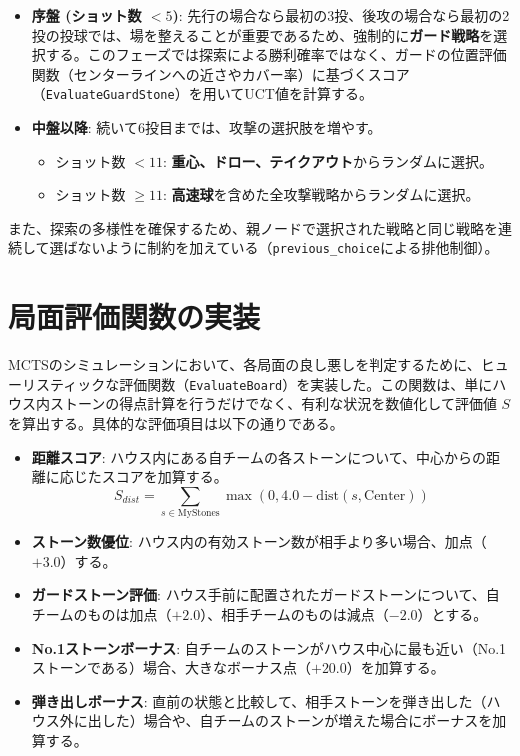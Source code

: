 \documentclass[11pt,a4j]{jreport}
\begin{document}
\begin{itemize}
    \item \textbf{序盤 (ショット数 $< 5$)}: 
    先行の場合なら最初の3投、後攻の場合なら最初の2投の投球では、場を整えることが重要であるため、強制的に\textbf{ガード戦略}を選択する。このフェーズでは探索による勝利確率ではなく、ガードの位置評価関数（センターラインへの近さやカバー率）に基づくスコア（\texttt{EvaluateGuardStone}）を用いてUCT値を計算する。
    
    \item \textbf{中盤以降}: 
    続いて6投目までは、攻撃の選択肢を増やす。
    \begin{itemize}
        \item ショット数 $ < 11$: \textbf{重心、ドロー、テイクアウト}からランダムに選択。
        \item ショット数 $\ge 11$: \textbf{高速球}を含めた全攻撃戦略からランダムに選択。
    \end{itemize}
\end{itemize}

また、探索の多様性を確保するため、親ノードで選択された戦略と同じ戦略を連続して選ばないように制約を加えている（\texttt{previous\_choice}による排他制御）。


\section{局面評価関数の実装}
MCTSのシミュレーションにおいて、各局面の良し悪しを判定するために、ヒューリスティックな評価関数（\texttt{EvaluateBoard}）を実装した。この関数は、単にハウス内ストーンの得点計算を行うだけでなく、有利な状況を数値化して評価値 $S$ を算出する。具体的な評価項目は以下の通りである。

\begin{itemize}
    \item \textbf{距離スコア}: ハウス内にある自チームの各ストーンについて、中心からの距離に応じたスコアを加算する。
    \[ S_{dist} = \sum_{s \in \text{MyStones}} \max(0, 4.0 - \text{dist}(s, \text{Center})) \]
    \item \textbf{ストーン数優位}: ハウス内の有効ストーン数が相手より多い場合、加点（$+3.0$）する。
    \item \textbf{ガードストーン評価}: ハウス手前に配置されたガードストーンについて、自チームのものは加点（$+2.0$）、相手チームのものは減点（$-2.0$）とする。
    \item \textbf{No.1ストーンボーナス}: 自チームのストーンがハウス中心に最も近い（No.1ストーンである）場合、大きなボーナス点（$+20.0$）を加算する。
    \item \textbf{弾き出しボーナス}: 直前の状態と比較して、相手ストーンを弾き出した（ハウス外に出した）場合や、自チームのストーンが増えた場合にボーナスを加算する。
\end{itemize}
\end{document}
